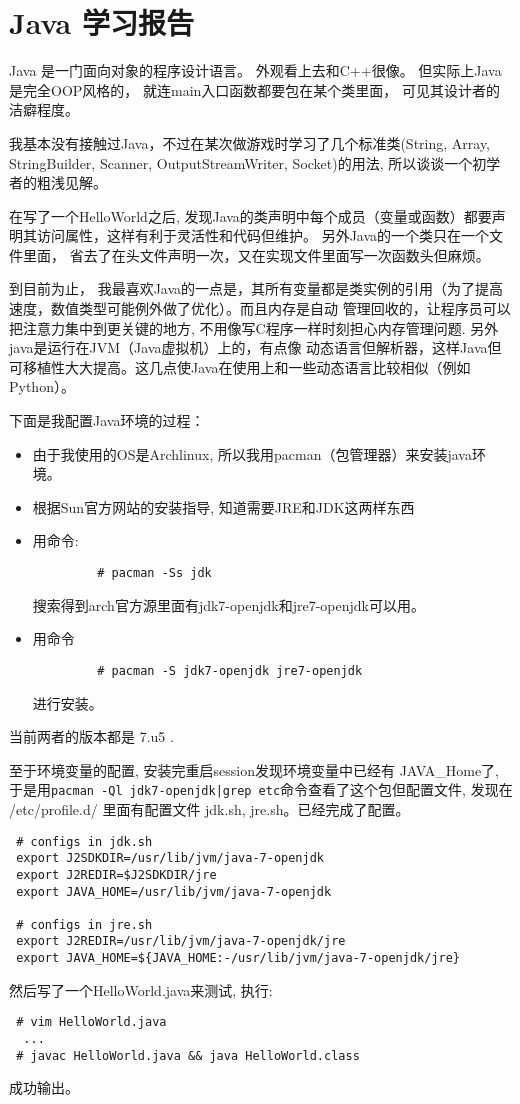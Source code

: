 \section{Java 学习报告}

 Java 是一门面向对象的程序设计语言。 外观看上去和C++很像。 但实际上Java是完全OOP风格的，
 就连main入口函数都要包在某个类里面， 可见其设计者的洁癖程度。

 我基本没有接触过Java，不过在某次做游戏时学习了几个标准类(String, Array, StringBuilder, Scanner, OutputStreamWriter, Socket)的用法, 
 所以谈谈一个初学者的粗浅见解。
 
 在写了一个HelloWorld之后, 发现Java的类声明中每个成员（变量或函数）都要声明其访问属性，这样有利于灵活性和代码但维护。
 另外Java的一个类只在一个文件里面， 省去了在头文件声明一次，又在实现文件里面写一次函数头但麻烦。

 到目前为止， 我最喜欢Java的一点是，其所有变量都是类实例的引用（为了提高速度，数值类型可能例外做了优化）。而且内存是自动
 管理回收的，让程序员可以把注意力集中到更关键的地方, 不用像写C程序一样时刻担心内存管理问题. 另外java是运行在JVM（Java虚拟机）上的，有点像
 动态语言但解析器，这样Java但可移植性大大提高。这几点使Java在使用上和一些动态语言比较相似（例如 Python）。

 下面是我配置Java环境的过程：

 \begin{itemize}
     \item 由于我使用的OS是Archlinux, 所以我用pacman（包管理器）来安装java环境。
     \item 根据Sun官方网站的安装指导, 知道需要JRE和JDK这两样东西
     \item 用命令:
         \begin{verbatim}
         # pacman -Ss jdk
         \end{verbatim}
         搜索得到arch官方源里面有jdk7-openjdk和jre7-openjdk可以用。
     \item 用命令
         \begin{verbatim}
         # pacman -S jdk7-openjdk jre7-openjdk
         \end{verbatim}
         进行安装。
 \end{itemize}
当前两者的版本都是 7.u5 .

 至于环境变量的配置, 安装完重启session发现环境变量中已经有 JAVA\_Home了, 于是用\verb=pacman -Ql jdk7-openjdk|grep etc=命令查看了这个包但配置文件,
 发现在 /etc/profile.d/ 里面有配置文件 jdk.sh, jre.sh。已经完成了配置。

 \begin{verbatim}
 # configs in jdk.sh
 export J2SDKDIR=/usr/lib/jvm/java-7-openjdk
 export J2REDIR=$J2SDKDIR/jre
 export JAVA_HOME=/usr/lib/jvm/java-7-openjdk

 # configs in jre.sh
 export J2REDIR=/usr/lib/jvm/java-7-openjdk/jre
 export JAVA_HOME=${JAVA_HOME:-/usr/lib/jvm/java-7-openjdk/jre}
 \end{verbatim}

 然后写了一个HelloWorld.java来测试, 执行:
 \begin{verbatim}
 # vim HelloWorld.java
  ...
 # javac HelloWorld.java && java HelloWorld.class
 \end{verbatim}
 成功输出。
